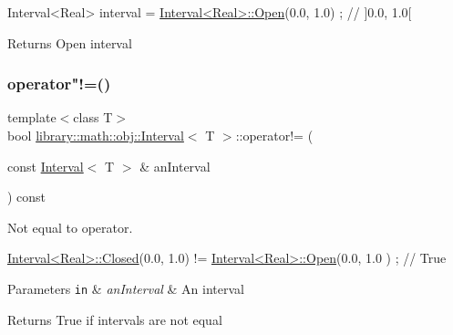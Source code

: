 \begin{DoxyCode}
Interval<Real> interval = \hyperlink{classlibrary_1_1math_1_1obj_1_1_interval_add0e1114a0c153da7a928fd059a08919}{Interval<Real>::Open}(0.0, 1.0) ; \textcolor{comment}{// ]0.0, 1.0[}
\end{DoxyCode}


\begin{DoxyReturn}{Returns}
Open interval 
\end{DoxyReturn}
\mbox{\label{classlibrary_1_1math_1_1obj_1_1_interval_a5ca4c08ba0aff1ea42ea3804d51e02cf}} 
\subsubsection{\texorpdfstring{operator"!=()}{operator!=()}}
{\footnotesize\ttfamily template$<$class T$>$ \\
bool \hyperlink{classlibrary_1_1math_1_1obj_1_1_interval}{library\+::math\+::obj\+::\+Interval}$<$ T $>$\+::operator!= (\begin{DoxyParamCaption}\item[{const \hyperlink{classlibrary_1_1math_1_1obj_1_1_interval}{Interval}$<$ T $>$ \&}]{an\+Interval }\end{DoxyParamCaption}) const}



Not equal to operator. 


\begin{DoxyCode}
\hyperlink{classlibrary_1_1math_1_1obj_1_1_interval_aae8bb2b89af450729338d48563def4d7}{Interval<Real>::Closed}(0.0, 1.0) != \hyperlink{classlibrary_1_1math_1_1obj_1_1_interval_add0e1114a0c153da7a928fd059a08919}{Interval<Real>::Open}(0.0, 1.0
      ) ; \textcolor{comment}{// True}
\end{DoxyCode}



\begin{DoxyParams}[1]{Parameters}
\mbox{\tt in}  & {\em an\+Interval} & An interval \\
\hline
\end{DoxyParams}
\begin{DoxyReturn}{Returns}
True if intervals are not equal 
\end{DoxyReturn}
\mbox{\label{classlibrary_1_1math_1_1obj_1_1_interval_a99b12768e33b75bf87ab656b92c03e98}} 
